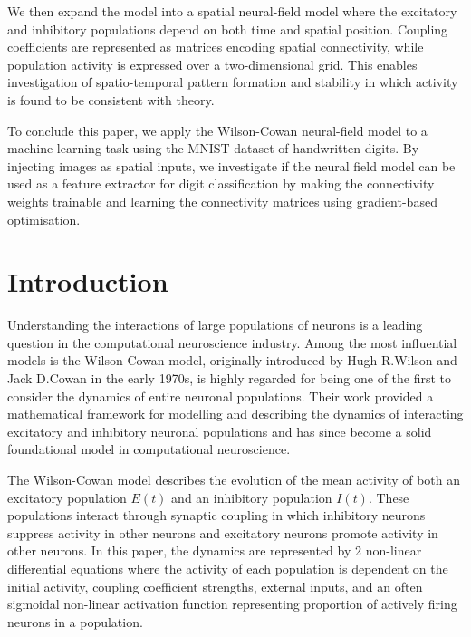 \documentclass[10pt]{article}
\begin{document}
\begin{flushleft}
    We then expand the model into a spatial neural-field model where the excitatory and inhibitory populations depend on both time and spatial position. Coupling coefficients are represented as matrices encoding spatial connectivity, while population activity is expressed over a two-dimensional grid. This enables investigation of spatio-temporal pattern formation and stability in which activity is found to be consistent with theory.
\end{flushleft}
\begin{flushleft}
     To conclude this paper, we apply the Wilson-Cowan neural-field model to a machine learning task using the MNIST dataset of handwritten digits. By injecting images as spatial inputs, we investigate if the neural field model can be used as a feature extractor for digit classification by making the connectivity weights trainable and learning the connectivity matrices using gradient-based optimisation.
\end{flushleft}

\section*{Introduction}

\begin{flushleft}
    Understanding the interactions of large populations of neurons is a leading question in the computational neuroscience industry. Among the most influential models is the Wilson-Cowan model, originally introduced by Hugh R.Wilson and Jack D.Cowan in the early 1970s, is highly regarded for being one of the first to consider the dynamics of entire neuronal populations. Their work provided a mathematical framework for modelling and describing the dynamics of interacting excitatory and inhibitory neuronal populations and has since become a solid foundational model in computational neuroscience.
\end{flushleft}

\begin{flushleft}
    The Wilson-Cowan model describes the evolution of the mean activity of both an excitatory population $E(t)$ and an inhibitory population $I(t)$. These populations interact through synaptic coupling in which inhibitory neurons suppress activity in other neurons and excitatory neurons promote activity in other neurons. In this paper, the dynamics are represented by 2 non-linear differential equations where the activity of each population is dependent on the initial activity, coupling coefficient strengths, external inputs, and an often sigmoidal non-linear activation function representing proportion of actively firing neurons in a population.
\end{flushleft}
\end{document}
